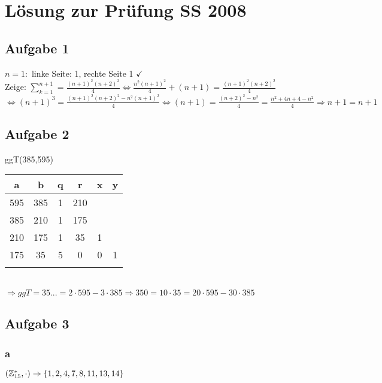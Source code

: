 \renewcommand{\ldate}{2015-06-25}	%

% 

\section{Lösung zur Prüfung SS 2008}

\subsection{Aufgabe 1}
$n=1: $ linke Seite: 1, rechte Seite 1 $\checkmark$\\
Zeige: $\sum_{k=1}^{n+1}=\frac{(n+1)^2 (n+2)^2}{4} \Leftrightarrow \frac{n^2 (n+1)^2}{4}+(n+1)=\frac{(n+1)^2 (n+2)^2}{4}$
$\Leftrightarrow (n+1)^3=\frac{(n+1)^2 (n+2)^2 - n^2 (n+1)^2}{4} \Leftrightarrow (n+1) = \frac{(n+2)^2 - n^2}{4} = \frac{n^2+4n+4-n^2}{4} \Rightarrow n+1=n+1$

\subsection{Aufgabe 2}
ggT(385,595)\\

\begin{tabular}{|c|c|c|c|c|c|}
\hline a & b & q & r & x & y \\ 
\hline 595 & 385 & 1 & 210 &  &  \\ 
\hline 385 & 210 & 1 & 175 &  &  \\ 
\hline 210 & 175 & 1 & 35 & 1 &  \\ 
\hline 175 & 35 & 5 & 0 & 0 & 1 \\ 
\hline  &  &  &  &  &  \\ 
\hline 
\end{tabular}\\
 
$\Rightarrow ggT = 35 ... = 2 \cdot  595 - 3 \cdot  385 \Rightarrow 350 = 10 \cdot  35 = 20 \cdot  595 - 30 \cdot  385$ 

\subsection{Aufgabe 3}

\subsubsection{a}
$(\mathbb{Z}_{15}^* ,\cdot) \Rightarrow \{1,2,4,7,8,11,13,14\}$\\

